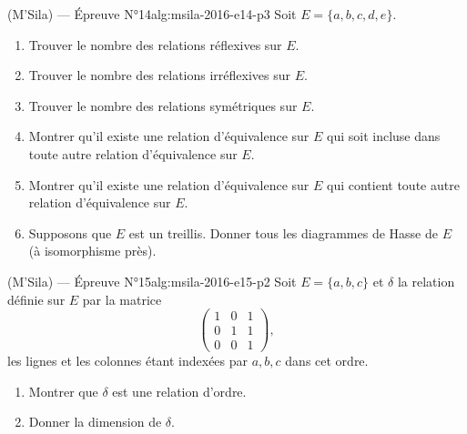 \begin{problem}{(M'Sila) — Épreuve N°14}{alg:msila-2016-e14-p3}
Soit $E = \{a, b, c, d, e\}$.
\begin{enumerate}
\item Trouver le nombre des relations réflexives sur $E$.
\item Trouver le nombre des relations irréflexives sur $E$.
\item Trouver le nombre des relations symétriques sur $E$.
\item Montrer qu'il existe une relation d'équivalence sur $E$ qui soit incluse dans
      toute autre relation d'équivalence sur $E$.
\item Montrer qu'il existe une relation d'équivalence sur $E$ qui contient toute
      autre relation d'équivalence sur $E$.
\item Supposons que $E$ est un treillis. Donner tous les diagrammes de Hasse de $E$
      (à isomorphisme près).
\end{enumerate}

\end{problem}

\newpage

\begin{problem}{(M'Sila) — Épreuve N°15}{alg:msila-2016-e15-p2}
Soit $E = \{a, b, c\}$ et $\delta$ la relation définie sur $E$ par la matrice
$$
\begin{pmatrix}1&0&1\\0&1&1\\0&0&1\end{pmatrix},
$$
les lignes et les colonnes étant indexées par $a, b, c$ dans cet ordre.
\begin{enumerate}
\item Montrer que $\delta$ est une relation d'ordre.
\item Donner la dimension de $\delta$.
\end{enumerate}

\end{problem}

\newpage

